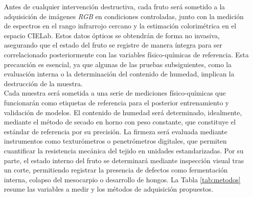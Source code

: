 Antes de cualquier intervención destructiva, cada fruto será sometido a la adquisición de imágenes \textit{RGB} en condiciones controladas, junto con la medición de espectros en el rango infrarrojo cercano y la estimación colorimétrica en el espacio CIELab. Estos datos ópticos se obtendrán de forma no invasiva, asegurando que el estado del fruto se registre de manera íntegra para ser correlacionado posteriormente con las variables físico-químicas de referencia. Esta precaución es esencial, ya que algunas de las pruebas subsiguientes, como la evaluación interna o la determinación del contenido de humedad, implican la destrucción de la muestra.\\

Cada muestra será sometida a una serie de mediciones físico-químicas que funcionarán como etiquetas de referencia para el posterior entrenamiento y validación de modelos. El contenido de humedad será determinado, idealmente, mediante el método de secado en horno con peso constante, que constituye el estándar de referencia por su precisión. La firmeza será evaluada mediante instrumentos como texturómetros o penetrómetros digitales, que permiten cuantificar la resistencia mecánica del tejido en unidades estandarizadas. Por su parte, el estado interno del fruto se determinará mediante inspección visual tras un corte, permitiendo registrar la presencia de defectos como fermentación interna, colapso del mesocarpio o desarrollo de hongos. La Tabla \ref{tab:metodos} resume las variables a medir y los métodos de adquisición propuestos.\\

